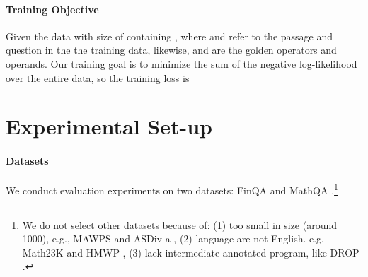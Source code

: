 \documentclass{article}
\begin{document}
\paragraph{Training Objective}
Given the data  with size of  containing , where  and  refer to the passage and question in the the  training data, likewise,  and  are the golden operators and operands. Our training goal is to minimize the sum of the negative log-likelihood over the entire data, so the training loss is 




\section{Experimental Set-up}



\paragraph{Datasets}
\label{section: datasets}
We conduct evaluation experiments on two datasets: FinQA \cite{finqa} and MathQA \cite{MathQA}.\footnote{We do not select other datasets because of: (1) too small in size (around 1000), e.g., MAWPS \cite{MAWPS} and ASDiv-a \cite{ref_18}, (2) language are not English. e.g. Math23K \cite{ref_22} and HMWP \cite{ref_13}, (3) lack intermediate annotated program, like DROP \cite{ref_19}.}
\end{document}

